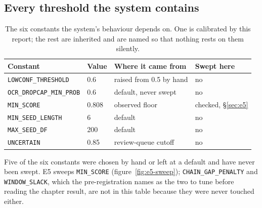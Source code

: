 \subsection{Every threshold the system contains}

\begin{table}[t]
  \centering
  \begin{tabular}{llll}
    \toprule
    Constant & Value & Where it came from & Swept here \\
    \midrule
    \texttt{LOWCONF\_THRESHOLD}    & 0.6   & raised from 0.5 by hand & no \\
    \texttt{OCR\_DROPCAP\_MIN\_PROB} & 0.6   & default, never swept  & no \\
    \texttt{MIN\_SCORE}            & 0.808 & observed floor          & checked, \S\ref{sec:e5} \\
    \texttt{MIN\_SEED\_LENGTH}     & 6     & default                 & no \\
    \texttt{MAX\_SEED\_DF}         & 200   & default                 & no \\
    \texttt{UNCERTAIN}             & 0.85  & review-queue cutoff     & no \\
    \bottomrule
  \end{tabular}
  \caption{The six constants the system's behaviour depends on. One is
    calibrated by this report; the rest are inherited and are named so that
    nothing rests on them silently.}
  \label{tab:thresholds}
\end{table}

Five of the six constants were chosen by hand or left at a default and have
never been swept. E5 sweeps \texttt{MIN\_SCORE}
(figure~\ref{fig:e5-sweep}); \texttt{CHAIN\_GAP\_PENALTY} and
\texttt{WINDOW\_SLACK}, which the pre-registration names as the two to tune
before reading the chapter result, are not in this table because they were
never touched either.
